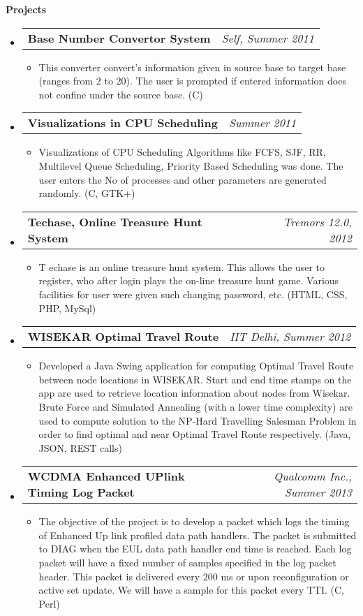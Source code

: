 \documentclass[letterpaper,10pt]{article}
\makeatletter
\newcommand{\resitem}[1]{\item #1 \vspace{-2pt}}
\newcommand{\resheading}[1]{{\large \colorbox{mygrey}{\begin{minipage}{\textwidth}{\textbf{#1 \vphantom{p\^{E}}}}\end{minipage}}}}
\newcommand{\ressubheading}[4]{
\begin{tabular*}{7.0in}{l@{\extracolsep{\fill}}r}
		\textbf{#1} & \textit{#4} \\
\end{tabular*}\vspace{-6pt}}
\makeatother
\begin{document}
\pagebreak
\resheading{Projects}
\begin{itemize}
\item
	\ressubheading{Base Number Convertor System}{Self}{Self}{Self, Summer 2011}
	\begin{itemize}
		\resitem{This converter convert's information given in source base to target base (ranges from 2 to 20). The user is prompted if entered information does not confine under the source base.  (C)}
	\end{itemize}


\item
	\ressubheading{Visualizations in CPU Scheduling}{Self}{Self}{Summer 2011}
	\begin{itemize}
		\resitem{Visualizations of CPU Scheduling Algorithms like FCFS, SJF, RR, Multilevel Queue Scheduling, Priority Based Scheduling was done. The user enters the No of processes and other parameters are generated randomly. (C, GTK+)}
	\end{itemize}


\item
	\ressubheading{Techase, Online Treasure Hunt System}{Self}{Self}{Tremors 12.0, 2012}
	\begin{itemize}
		\resitem Techase is an online treasure hunt system. This allows the user to register, who after login plays the on-line treasure hunt game. Various facilities for user were given such changing password, etc. (HTML, CSS, PHP, MySql)
	\end{itemize}

\item
	\ressubheading{WISEKAR Optimal Travel Route}{Self}{Self}{IIT Delhi, Summer 2012}
	\begin{itemize}
		\resitem{Developed a Java Swing application for computing Optimal Travel Route between node locations in WISEKAR. Start and end time stamps on the app are used to retrieve location information about nodes from Wisekar. Brute Force and Simulated Annealing (with a lower time complexity) are used to compute solution to the NP-Hard Travelling Salesman Problem in order to find optimal and near Optimal Travel Route respectively. (Java, JSON, REST calls)}
	\end{itemize}


\item
	\ressubheading{WCDMA Enhanced UPlink Timing Log Packet}{Self}{Self}{Qualcomm Inc., Summer 2013}
	\begin{itemize}
		\resitem{The objective of the project is to develop a packet which logs the timing of Enhanced Up link profiled data path handlers. The packet is submitted to DIAG when the EUL data path handler end time is reached. Each log packet will have a fixed number of samples specified in the log packet header. This packet is delivered every 200 ms or upon reconfiguration or active set update. We will have a sample for this packet every TTI. (C, Perl)}
	\end{itemize}



\end{itemize}
\end{document}
